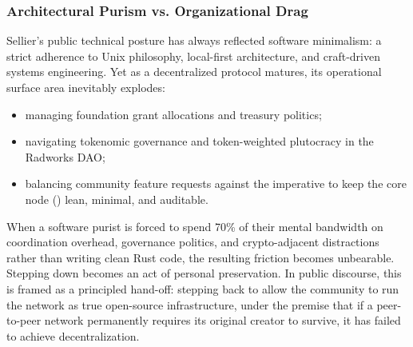 \documentclass[a4paper,11pt,twoside,parskip=half-,headings=small]{scrartcl}
\begin{document}
\subsubsection{Architectural Purism vs. Organizational Drag}
Sellier's public technical posture has always reflected software minimalism: a strict adherence to Unix philosophy, local-first architecture, and craft-driven systems engineering. Yet as a decentralized protocol matures, its operational surface area inevitably explodes:
\begin{itemize}
  \item managing foundation grant allocations and treasury politics;
  \item navigating tokenomic governance and token-weighted plutocracy in the Radworks DAO;
  \item balancing community feature requests against the imperative to keep the core node () lean, minimal, and auditable.
\end{itemize}
When a software purist is forced to spend 70\% of their mental bandwidth on coordination overhead, governance politics, and crypto-adjacent distractions rather than writing clean Rust code, the resulting friction becomes unbearable. Stepping down becomes an act of personal preservation. In public discourse, this is framed as a principled hand-off: stepping back to allow the community to run the network as true open-source infrastructure, under the premise that if a peer-to-peer network permanently requires its original creator to survive, it has failed to achieve decentralization.
\end{document}
